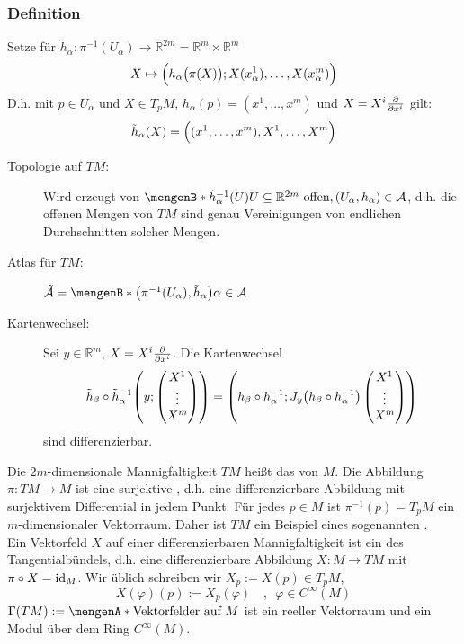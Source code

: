 \subsubsection[Definition: Tangentialbündel]{Definition} %
\label{ssub:411}
Setze für $\tilde{h}_\alpha : \pi ^{-1}(U_\alpha) \to \mathds{R}^{2m}= \mathds{R}^m \times \mathds{R}^m$ 
\[
	X \mapsto \enbrace[\Big]{h_\alpha \enbrace[\big]{\pi(X)}; X(x_\alpha^1), \ldots , X(x_\alpha^m)}
\]
D.h. mit $p \in U_\alpha$ und $X \in T_pM$, $h_\alpha(p)= (x^1, \ldots , x^m)$ und $X= X^i \diff{}{x^i} $ gilt:
\[
	\tilde{h}_\alpha(X) = \enbrace[\Big]{(x^1, \ldots , x^m), X^1, \ldots , X^m} 
\]
\begin{description}
	\item[Topologie auf $TM$:] Wird erzeugt von 
	$\set[\tilde{h}_\alpha ^{-1}(U)]{U \subseteq \mathds{R}^{2m} \text{ offen}, (U_\alpha, h_\alpha) \in \mathcal{A}}$,
	d.h. die offenen Mengen von $TM$ sind genau Vereinigungen von endlichen Durchschnitten solcher Mengen. 
	\item[Atlas für $TM$:] $\tilde{\mathcal{A}} = \set[\enbrace*{\pi ^{-1}(U_\alpha), \tilde{h}_\alpha} ]{\alpha \in \mathcal{A}}$
	\item[Kartenwechsel:] Sei $y \in \mathds{R}^m$, $X= X^i \diff{}{x^i}$. Die Kartenwechsel
	\[
		\tilde{h}_\beta \circ \tilde{h}_\alpha ^{-1} \enbrace*{y; \begin{pmatrix}
			X^1 \\
			\vdots \\
			X^m
		\end{pmatrix}} = \enbrace*{h_\beta \circ h_\alpha ^{-1}; J_y \enbrace*{h_\beta \circ  h_\alpha ^{-1}} \begin{pmatrix}
			X^1 \\
			\vdots \\
			X^m
		\end{pmatrix} } 
	\]
	sind differenzierbar.
\end{description}
Die $2m$-dimensionale Mannigfaltigkeit $TM$ heißt das  von $M$. Die Abbildung $\pi : TM  \to M$ ist eine surjektive , d.h. eine
differenzierbare Abbildung mit surjektivem Differential in jedem Punkt. Für jedes $p \in M$ ist $\pi ^{-1}(p)= T_p M$ ein $m$-dimensionaler Vektorraum. Daher ist $TM$
ein Beispiel eines sogenannten .\\
Ein Vektorfeld $X$ auf einer differenzierbaren Mannigfaltigkeit ist ein  des Tangentialbündels, d.h. eine differenzierbare Abbildung $X: M \to TM$ mit 
$\pi \circ X = \id_M$. Wir üblich schreiben wir $X_p := X(p) \in T_pM$,
\[
	X(\varphi)(p) := X_p(\varphi) \quad ,  \enspace\varphi \in C^\infty(M)
\]
$\Gamma(TM) := \set{\text{Vektorfelder auf }M}$ ist ein reeller Vektorraum und ein Modul über dem Ring $C^\infty(M)$.
